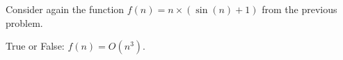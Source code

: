 \begin{prob}
    Consider again the function $f(n) = n \times ( \sin (n) + 1)$ from the previous
    problem.

    True or False: $f(n) = O(n^3)$.

    \Tf{}

\end{prob}
